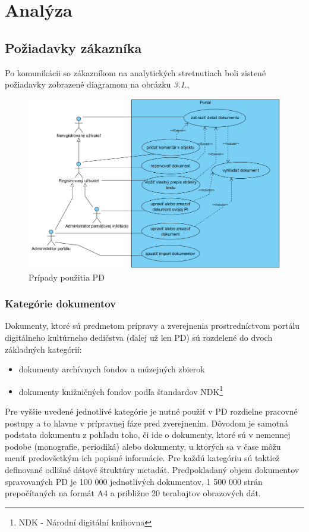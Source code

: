 \documentclass[
  print, %
  table,   %
  lof,     %
  nolot,     %
]{fithesis3}
\begin{document}
\chapter{Analýza}
\section{Požiadavky zákazníka}
Po komunikácii so zákazníkom na analytických stretnutiach boli zistené požiadavky zobrazené diagramom na obrázku \textit{3.1}.\cite{uml1},\cite{uml2}
\begin{figure}[H]
	\centering
		\includegraphics[width=\textwidth]{fithesis/diagram/useCase.png}
	
	\caption{Prípady použitia PD}
	\label{useCaseDG}
\end{figure}

\subsection{Kategórie dokumentov}
Dokumenty, ktoré sú predmetom prípravy a zverejnenia prostredníctvom portálu digitálneho kultúrneho dedičstva (ďalej už len PD) sú rozdelené do dvoch základných kategórií:
\begin{itemize}
	\item dokumenty archívnych fondov a múzejných zbierok				
	\item dokumenty knižničných fondov podľa štandardov NDK\footnote{NDK - Národní digitální knihovna}
\end{itemize}
Pre vyššie uvedené jednotlivé kategórie je nutné použiť v PD rozdielne pracovné postupy a to hlavne v prípravnej fáze pred zverejnením. Dôvodom je samotná podstata dokumentu z pohľadu toho, či ide o dokumenty, ktoré sú v nemennej podobe (monografie, periodiká) alebo dokumenty, u ktorých sa v čase môžu meniť predovšetkým ich popisné informácie. Pre každú kategóriu sú taktiež definované odlišné dátové štruktúry metadát. Predpokladaný objem dokumentov spravovaných PD je 100 000 jednotlivých dokumentov, 1 500 000 strán prepočítaných na formát A4 a približne 20 terabajtov obrazových dát.
\end{document}

